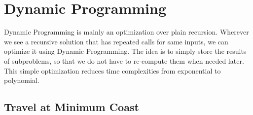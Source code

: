 \newpage
\chapter{\textbf{Dynamic Programming}}
Dynamic Programming is mainly an optimization over plain recursion. Wherever we see a recursive solution that has repeated calls for same inputs, we can optimize it using Dynamic Programming. The idea is to simply store the results of subproblems, so that we do not have to re-compute them when needed later. This simple optimization reduces time complexities from exponential to polynomial.

\section{\textbf{Travel at Minimum Coast}}

